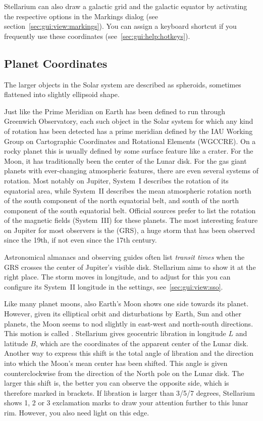 Stellarium can also draw a galactic grid and the galactic equator by
activating the respective options in the Markings dialog (see
section~\ref{sec:gui:view:markings}). You can assign a keyboard
shortcut if you frequently use these coordinates
(see~\ref{sec:gui:help:hotkeys}).


\subsection{Planet Coordinates}
\label{sec:Concepts:PlanetCoordinates}

The larger objects in the Solar system are described as spheroids,
sometimes flattened into slightly ellipsoid shape.

Just like the Prime Meridian on Earth has been defined to run through
Greenwich Observatory, each such object in the Solar system for which
any kind of rotation has been detected has a prime meridian defined by
the IAU Working Group on Cartographic Coordinates and Rotational
Elements (WGCCRE). On a rocky planet this is usually defined by some
surface feature like a crater. For the Moon, it has traditionally been
the center of the Lunar disk. For the gas giant planets with
ever-changing atmospheric features, there are even several systems of
rotation. Most notably on Jupiter, System~I describes the rotation of
its equatorial area, while System~II describes the mean atmospheric
rotation north of the south component of the north equatorial belt,
and south of the north component of the south equatorial
belt. Official sources prefer to list the rotation of the magnetic
fields (System~III) for these planets. The most interesting feature on
Jupiter for most observers is the  (GRS), a
huge storm that has been observed since the 19th, if not even since
the 17th century.

Astronomical almanacs and observing guides often list \emph{transit
  times} when the GRS crosses the center of Jupiter's visible
disk. Stellarium aims to show it at the right place. The storm moves
in longitude, and to adjust for this you can configure its System~II
longitude in the settings, see~\ref{sec:gui:view:sso}.

Like many planet moons, also Earth's Moon shows one side towards its
planet. However, given its elliptical orbit and disturbations by
Earth, Sun and other planets, the Moon seems to nod slightly in
east-west and north-south directions. This motion is called
.  Stellarium gives geocentric
libration in longitude $L$ and latitude $B$, which are the coordinates
of the apparent center of the Lunar disk. Another way to express this
shift is the total angle of libration and the direction into which the
Moon's mean center has been shifted. This angle is given
counterclockwise from the direction of the North pole on the Lunar
disk. The larger this shift is, the better you can observe the
opposite side, which is therefore marked in brackets. If libration is
larger than 3/5/7 degrees, Stellarium shows 1, 2 or 3 exclamation
marks to draw your attention further to this lunar rim. However, you
also need light on this edge.

